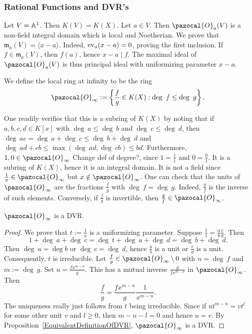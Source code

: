 \subsubsection{Rational Functions and DVR's}
\begin{example}
    Let $V=\mathbb{A}^1$. Then $K(V)=K(X)$. Let $a\in V$. Then $\pazocal{O}_a(V)$ is a non-field integral domain which is local and Noetherian. We prove that $\mathfrak{m}_a(V) = \langle x-a\rangle$. Indeed, $\mathrm{ev}_a(x-a)=0$, proving the first inclusion. If $f\in \mathfrak{m}_a(V)$, then $f(a)$, hence $x-a\mid f$. The maximal ideal of $\pazocal{O}_a(V)$ is thus principal ideal with uniformizing parameter $x-a$.  
\end{example}
\begin{definition}
    We define the local ring at infinity to be the ring 
    $$\pazocal{O}_\infty := \left\{\frac{f}{g}\in K(X) : \deg\ f\leq \deg\ g\right\}.$$
\end{definition}
\begin{remark}
    One readily verifies that this is a subring of $K(X)$ by noting that if $a,b,c,d\in K[x]$ with $\deg \ a \leq \deg \ b$ and $\deg \ c \le \deg \ d$, then $\deg\ ac = \deg \ a + \deg \ c \leq \deg \ b +\deg \ d$ and $\deg \ ad+cb \leq \max (\deg \ ad,\deg \ cb)\leq bd$. Furthermore, $1,0\in \pazocal{O}_\infty$ {\Large Change def of degree?}, since $1 = \frac{1}{1}$ and $0 = \frac{0}{1}$. It is a subring of $K(X)$, hence it is an integral domain. It is not a field since $\frac{1}{x}\in \pazocal{O}_\infty$ but $x\notin \pazocal{O}_\infty $. One can check that the units of $\pazocal{O}_\infty$ are the fractions $\frac{f}{g}$ with $\deg \ f = \deg \ g$. Indeed, $\frac{g}{f}$ is the inverse of such elements. Conversely, if $\frac{f}{g}$ is invertible, then $\frac{g}{f}\in \pazocal{O}_\infty$. 
\end{remark}
\begin{proposition}
    $\pazocal{O}_\infty$ is a DVR. 
\end{proposition}
\begin{proof}
    We prove that $t:=\frac{1}{x}$ is a uniformizing parameter. Suppose $\frac{1}{t} = \frac{a}{b}\frac{c}{d}$. Then 
    $$1 + \deg \ a + \deg \ c =\deg\ t+ \deg \ a +\deg \ d = \deg\ b+\deg \ d.$$
    Then $\deg \ a = \deg b$ or $\deg \ c = \deg \ d$, hence $\frac{a}{b}$ is a unit or $\frac{c}{d}$ is a unit. Consequently, $t$ is irreducible.  Let $\frac{f}{g}\in\pazocal{O}_\infty\setminus 0$ with $n =\deg \ f$ and $m:=\deg\ g$. Set $u =\frac{fx^{m-n}}{g}$. This has a mutual inverse $\frac{g}{fx^{m-n}}$ in $\pazocal{O}_\infty$. Then 
    $$\frac{f}{g} = \frac{fx^{m-n}}{g}\frac{1}{x^{m-n}}.$$
    The uniqueness really just follows from $t$ being irreducible. Since if $ut^{m-n}=vt^l$ for some other unit $v$ and $l\geq 0$, then $m-n-l = 0$ and hence $u=v$. By Proposition~\ref{EquivalentDefinitionOfDVR}, $\pazocal{O}_\infty$ is a DVR. 
\end{proof}
